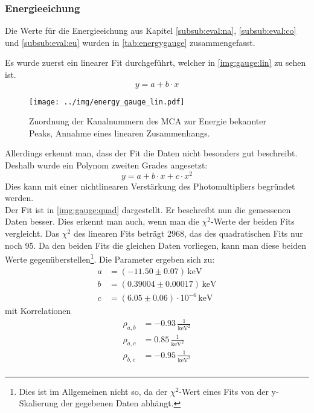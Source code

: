 \subsubsection{Energieeichung}
Die Werte für die Energieeichung aus Kapitel \ref{subsub:eval:na}, \ref{subsub:eval:co} und \ref{subsub:eval:eu} wurden in 
\autoref{tab:energygauge} zusammengefasst.

Es wurde zuerst ein linearer Fit durchgeführt, welcher in \autoref{img:gauge:lin} zu sehen ist.
\begin{equation}
  y = a + b\cdot x
\end{equation}
\label{subsub:energygauge}
\begin{figure}[H]
\begin{center}
  \texttt{[image: ../img/energy\_gauge\_lin.pdf]}
  \caption{Zuordnung der Kanalnummern des MCA zur Energie bekannter Peaks,
  Annahme eines linearen Zusammenhangs.}
  \label{img:gauge:lin}
\end{center}
\end{figure}
Allerdings erkennt man, dass der Fit die Daten nicht besonders gut beschreibt. Deshalb wurde ein Polynom zweiten Grades angesetzt:
\begin{equation}
  y = a + b\cdot x + c\cdot x^2
\end{equation}
Dies kann mit einer nichtlinearen Verstärkung des Photomultipliers begründet werden.\\
Der Fit ist in \autoref{img:gauge:quad} dargestellt. Er beschreibt nun die gemessenen Daten besser. Dies erkennt man auch, 
wenn man die $\chi^2$-Werte der beiden Fits vergleicht. Das $\chi^2$ des linearen Fits beträgt 2968, das des quadratischen Fits 
nur noch 95. Da den beiden Fits die gleichen Daten vorliegen, kann man diese beiden Werte gegenüberstellen\footnote{Dies ist im Allgemeinen nicht so,
da der $\chi^2$-Wert eines Fits von der y-Skalierung der gegebenen Daten abhängt.}.
Die Parameter ergeben sich zu:
\begin{equation}
\begin{split}
  \label{eq:energygauge:params}
  a &= (-11.50 \pm 0.07) \,\text{keV} \\
  b &= (0.39004 \pm 0.00017) \,\text{keV} \\
  c &= (6.05 \pm 0.06) \cdot 10^{-6} \,\text{keV}
\end{split}
\end{equation}
mit Korrelationen
\begin{equation}
\begin{split}
  \label{eq:energygauge:corr}
  \rho_{a, b} &= -0.93 \, \frac{1}{\text{keV}^2} \\
  \rho_{a, c} &=  0.85 \, \frac{1}{\text{keV}^2} \\
  \rho_{b, c} &= -0.95 \, \frac{1}{\text{keV}^2} \\
\end{split}
\end{equation}
